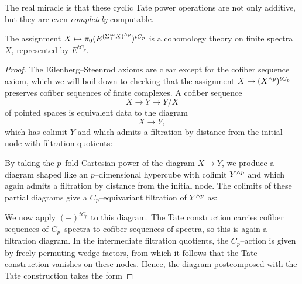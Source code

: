 The real miracle is that these cyclic Tate power operations are not only additive, but they are even \emph{completely} computable.

\begin{lemma}\label{TateConstructionIsACohomThy}
The assignment \(X \mapsto \pi_0 (E^{(\Sigma^\infty_+ X)^{\wedge p}})^{tC_p}\) is a cohomology theory on finite spectra \(X\), represented by \(E^{tC_p}\).
\end{lemma}
\begin{proof}
The Eilenberg--Steenrod axioms are clear except for the cofiber sequence axiom, which we will boil down to checking that the assignment \(X \mapsto (X^{\wedge p})^{tC_p}\) preserves cofiber sequences of finite complexes.  A cofiber sequence \[X \to Y \to Y/X\] of pointed spaces is equivalent data to the diagram \[X \to Y,\] which has colimit \(Y\) and which admits a filtration by distance from the initial node with filtration quotients:
\begin{center}
\end{center}
By taking the \(p\)--fold Cartesian power of the diagram \(X \to Y\), we produce a diagram shaped like an \(p\)--dimensional hypercube with colimit \(Y^{\wedge p}\) and which again admits a filtration by distance from the initial node.  The colimits of these partial diagrams give a \(C_p\)--equivariant filtration of \(Y^{\wedge p}\) as:
\begin{center}
\end{center}
We now apply \((-)^{tC_p}\) to this diagram.  The Tate construction carries cofiber sequences of \(C_p\)--spectra to cofiber sequences of spectra, so this is again a filtration diagram.  In the intermediate filtration quotients, the \(C_p\)--action is given by freely permuting wedge factors, from which it follows that the Tate construction vanishes on these nodes.  Hence, the diagram postcomposed with the Tate construction takes the form

\end{proof}
